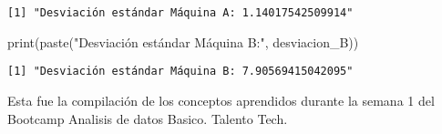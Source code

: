 \documentclass[
  letterpaper,
  DIV=11,
  numbers=noendperiod]{scrartcl}
\newenvironment{Shaded}{\begin{snugshade}}{\end{snugshade}}
\newcommand{\FunctionTok}[1]{\textcolor[rgb]{0.28,0.35,0.67}{#1}}
\newcommand{\NormalTok}[1]{\textcolor[rgb]{0.00,0.23,0.31}{#1}}
\newcommand{\StringTok}[1]{\textcolor[rgb]{0.13,0.47,0.30}{#1}}
\begin{document}
\begin{verbatim}
[1] "Desviación estándar Máquina A: 1.14017542509914"
\end{verbatim}

\begin{Shaded}
\begin{Highlighting}[]
\FunctionTok{print}\NormalTok{(}\FunctionTok{paste}\NormalTok{(}\StringTok{"Desviación estándar Máquina B:"}\NormalTok{, desviacion\_B))}
\end{Highlighting}
\end{Shaded}

\begin{verbatim}
[1] "Desviación estándar Máquina B: 7.90569415042095"
\end{verbatim}

Esta fue la compilación de los conceptos aprendidos durante la semana 1
del Bootcamp Analisis de datos Basico. Talento Tech.
\end{document}
